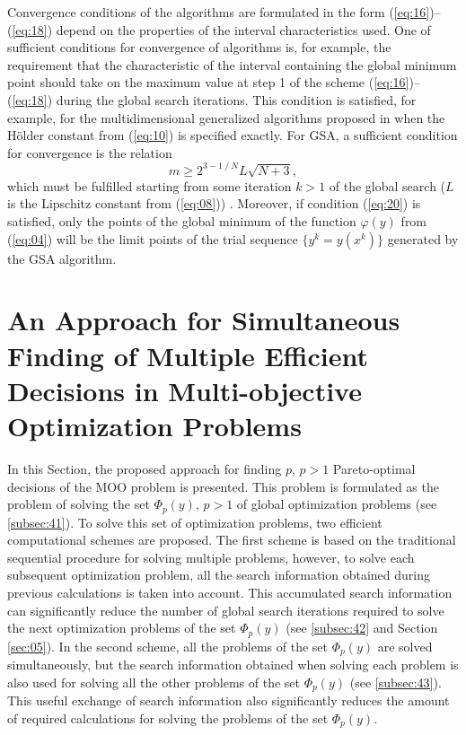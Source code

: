 \documentclass[runningheads]{llncs}
\begin{document}
Convergence conditions of the algorithms are formulated in the form (\ref{eq:16})--(\ref{eq:18}) depend on the properties of the interval characteristics used. One of sufficient conditions for convergence of algorithms is, for example, the requirement that the characteristic of the interval containing the global minimum point should take on the maximum value at step 1 of the scheme (\ref{eq:16})--(\ref{eq:18}) during the global search iterations. This condition is satisfied, for example, for the multidimensional generalized algorithms proposed in \cite{c22,c23} when the H{\"o}lder constant from (\ref{eq:10}) is specified exactly. For GSA, a sufficient condition for convergence is the relation 
\begin{equation}
\label{eq:20}
m \geq 2^{3-1⁄N} L\sqrt{N+3},
\end{equation}
which must be fulfilled starting from some iteration $k>1$ of the global search ($L$ is the Lipschitz constant from (\ref{eq:08})) \cite{c15}. Moreover, if condition (\ref{eq:20}) is satisfied, only the points of the global minimum of the function $\varphi(y)$ from (\ref{eq:04}) will be the limit points of the trial sequence $\{y^k=y(x^k)\}$ generated by the GSA algorithm.

\section{An Approach for Simultaneous Finding of Multiple Efficient Decisions in Multi-objective Optimization Problems} \label{sec:04}

In this Section, the proposed approach for finding $p$, $p>1$ Pareto-optimal decisions of the MOO problem is presented. This problem is formulated as the problem of solving the set $\Phi_p (y)$, $p>1$ of global optimization problems (see \ref{subsec:41}). To solve this set of optimization problems, two efficient computational schemes are proposed. The first scheme is based on the traditional sequential procedure for solving multiple problems, however, to solve each subsequent optimization problem, all the search information obtained during previous calculations is taken into account. This accumulated search information can significantly reduce the number of global search iterations required to solve the next optimization problems of the set $\Phi_p (y)$ (see \ref{subsec:42} and Section \ref{sec:05}). In the second scheme, all the problems of the set $\Phi_p (y)$ are solved simultaneously, but the search information obtained when solving each problem is also used for solving all the other problems of the set $\Phi_p (y)$ (see \ref{subsec:43}). This useful exchange of search information also significantly reduces the amount of required calculations for solving the problems of the set $\Phi_p (y)$.
\end{document}
